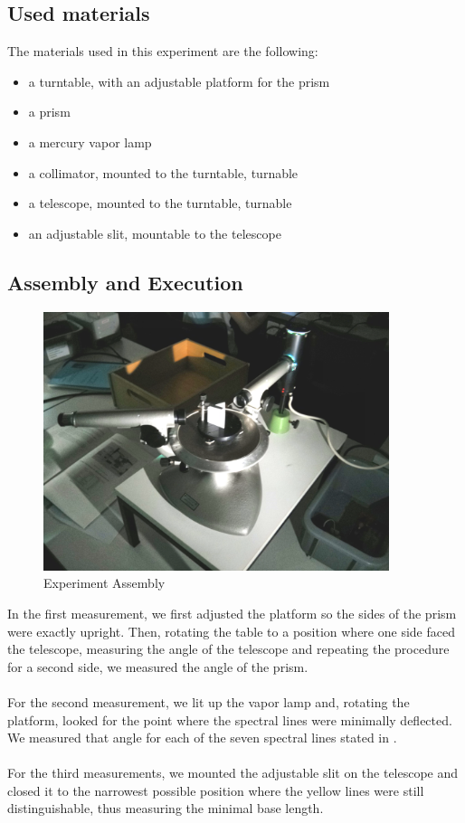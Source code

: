 \documentclass{scrreprt}
\begin{document}
\subsection{Used materials}
The materials used in this experiment are the following:
\begin{itemize}
\item a turntable, with an adjustable platform for the prism
\item a prism
\item a mercury vapor lamp
\item a collimator, mounted to the turntable, turnable 
\item a telescope, mounted to the turntable, turnable
\item an adjustable slit, mountable to the telescope
\end{itemize}

\subsection{Assembly and Execution}

\begin{figure}[H]
	\centering
  \includegraphics[width=0.9\textwidth]{img/assembly.jpg}
	\caption{Experiment Assembly}
	\label{fig:assembly}
\end{figure}

In the first measurement, we first adjusted the platform so the sides of the prism were exactly upright. Then, rotating the table to a position where one side faced the telescope, measuring the angle of the telescope and repeating the procedure for a second side, we measured the angle of the prism.
\\\\
For the second measurement, we lit up the vapor lamp and, rotating the platform, looked for the point where the spectral lines were minimally deflected. We measured that angle for each of the seven spectral lines stated in \cite[p. 159]{physcript13}. 
\\\\
For the third measurements, we mounted the adjustable slit on the telescope and closed it to the narrowest possible position where the yellow lines were still distinguishable, thus measuring the minimal base length. 
\end{document}
